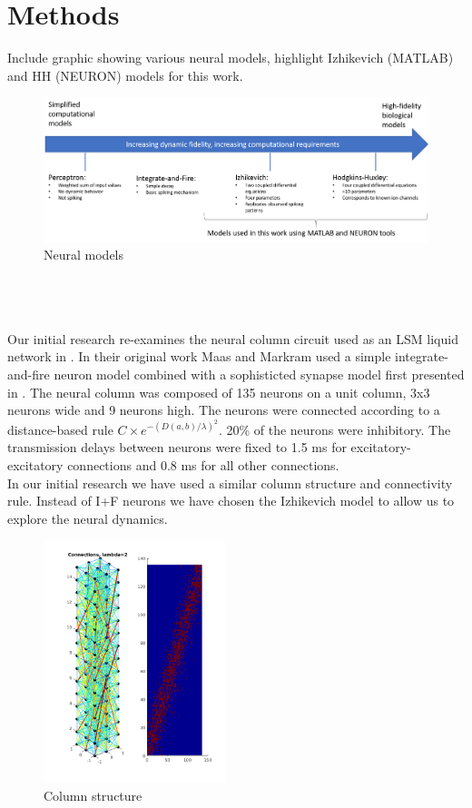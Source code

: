 \documentclass[a4paper,11pt]{article}
\begin{document}
\section{Methods}
Include graphic showing various neural models, highlight Izhikevich \cite{izhikevich2003} (MATLAB) and HH (NEURON) models for this work.
\begin{figure}[ht]
 \caption{Neural models}
 \centering
   \includegraphics[width=\textwidth]{fig/neural_models}
\end{figure}\\
\\ \\
Our initial research re-examines the neural column circuit used as an LSM liquid network in \cite{maas2002}.
In their original work Maas and Markram used a simple integrate-and-fire neuron model combined with a sophisticted synapse model first presented in \cite{markram1998}.
The neural column was composed of 135 neurons on a unit column, 3x3 neurons wide and 9 neurons high.
The neurons were connected according to a distance-based rule $C \times e^{-(D(a,b)/\lambda)^2} $.
20\% of the neurons were inhibitory. 
The transmission delays between neurons were fixed to 1.5 ms for excitatory-excitatory connections and 0.8 ms for all other connections.
\\
In our initial research we have used a similar column structure and connectivity rule. 
Instead of I+F neurons we have chosen the Izhikevich model \cite{izhikevich2003} to allow us to explore the neural dynamics.
\\
\begin{figure}[ht]
 \caption{Column structure}
 \centering
   \includegraphics[width=200px]{fig/lambda2}
\end{figure}
\end{document}
